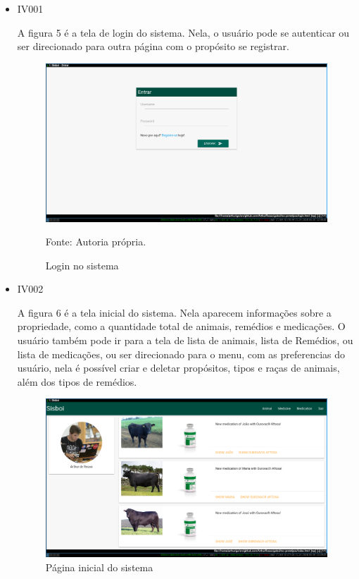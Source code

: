 \begin{itemize}
\item IV001

A figura 5 é a tela de login do sistema. Nela, o usuário pode se autenticar ou ser direcionado para outra página com o propósito se registrar.
\begin{figure}[H]
	\begin{center}
		\caption{Login no sistema}
		\includegraphics[width=\textwidth]{../img/prototipos/login.png}

		Fonte: Autoria própria.
	\end{center}
\end{figure}

\item IV002

A figura 6 é a tela inicial do sistema. Nela aparecem informações sobre a propriedade, como a quantidade total de animais, remédios e medicações. O usuário também pode ir para a tela de lista de animais, lista de Remédios, ou lista de medicações, ou ser direcionado para o menu, com as preferencias do usuário, nela é possível criar e deletar propósitos, tipos e raças de animais, além dos tipos de remédios.

\begin{figure}[H]
	\begin{center}
		\caption{Página inicial do sistema}
		\includegraphics[width=\textwidth]{../img/prototipos/index.png}


\end{center}
\end{figure}
\end{itemize}
